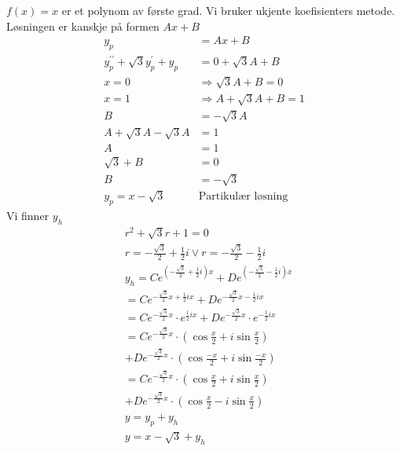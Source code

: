 \documentclass[defaultpackages]{cheatsheet}
\begin{document}
		\subsubsection{}
	$f(x) = x$ er et polynom av første grad. Vi bruker ukjente koefisienters metode. Løsningen er kanskje på formen $Ax+B$
	\begin{align*}
		y_p &= Ax + B\\
		y^{\prime\prime}_p + \sqrt{3}y_p^\prime + y_p &= 0 + \sqrt{3}A + B\\
		x=0&\Rightarrow\sqrt{3}A + B = 0\\
		x=1&\Rightarrow A\!+\!\sqrt{3}A\!+\!B=1\\
		B&=-\sqrt{3}A\\
		A + \sqrt{3}A - \sqrt{3}A &= 1\\
		A &= 1\\
		\sqrt{3} + B &= 0\\
		B &= -\sqrt{3}\\
		y_p = x - \sqrt{3} \quad&\text{Partikulær løsning}
	\end{align*}
	Vi finner $y_h$
	\begin{align*}
		&r^2 + \sqrt{3}r + 1 = 0\\
		&r = -\frac{\sqrt{3}}{2} + \frac{1}{2}i \vee r = -\frac{\sqrt{3}}{2} - \frac{1}{2}i\\
		&y_h = Ce^{\left(-\frac{\sqrt{3}}{2} + \frac{1}{2}i\right)x}+  De^{\left(-\frac{\sqrt{3}}{2} - \frac{1}{2}i\right)x}\\
		&= Ce^{-\frac{\sqrt{3}}{2}x + \frac{1}{2}ix} + De^{-\frac{\sqrt{3}}{2}x - \frac{1}{2}ix}\\
		&= Ce^{-\frac{\sqrt{3}}{2}x} \cdot e^{\frac{1}{2}ix} + De^{-\frac{\sqrt{3}}{2}x} \cdot e ^ {-\frac{1}{2}ix}\\
		&= Ce^{-\frac{\sqrt{3}}{2}x} \cdot \left(\cos\frac{x}{2} + i\sin{\frac{x}{2}}\right)\\
		&+De^{-\frac{\sqrt{3}}{2}x} \cdot \left(\cos\frac{-x}{2} + i\sin\frac{-x}{2}\right)\\
		&= Ce^{-\frac{\sqrt{3}}{2}x} \cdot \left(\cos\frac{x}{2} + i\sin{\frac{x}{2}}\right)\\
		&+De^{-\frac{\sqrt{3}}{2}x} \cdot \left(\cos\frac{x}{2} - i\sin\frac{x}{2}\right)\\
		&y = y_p + y_h\\
		&y = x - \sqrt{3} + y_h
	\end{align*}
	\subsection{}
\end{document}
